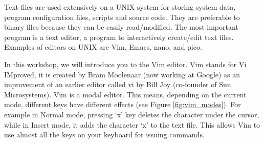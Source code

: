 

Text files are used extensively on a UNIX system for storing system data,
program configuration files, scripts and source code. They are preferable to
binary files because they can be easily read/modified.  The most important
program is a text editor, a program to interactively create/edit text files.
Examples of editors on UNIX are Vim, Emacs, nano, and pico. 

\begin{frame}
\end{frame}


In this workshop, we will introduce you to the Vim editor.  Vim stands for Vi
IMproved, it is created by Bram Moolenaar (now working at Google) as an
improvement of an earlier editor called vi by Bill Joy (co-founder of Sun
Microsystems).  Vim is a modal editor. This means, depending on the current
mode, different keys have different effects (see Figure \ref{fig:vim_modes}).  
For example in Normal mode, pressing `x' key deletes the character under the
cursor, while in Insert mode, it adds the character `x' to the text file. This
allows Vim to use almost all the keys on your keyboard for issuing commands.  

